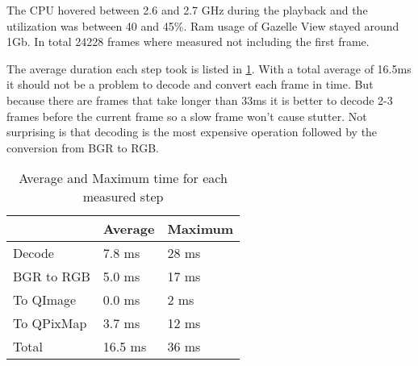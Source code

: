 The CPU hovered between 2.6 and 2.7 GHz during the playback and the utilization was between 40 and 45\%. Ram usage of Gazelle View stayed around 1Gb. In total 24228 frames where measured not including the first frame.

The average duration each step took is listed in \ref{tab:averageMaximumTime}. With a total average of 16.5ms it should not be a problem to decode and convert each frame in time. But because there are frames that take longer than 33ms it is better to decode 2-3 frames before the current frame so a slow frame won't cause stutter. Not surprising is that decoding is the most expensive operation followed by the conversion from \gls{BGR} to \gls{RGB}.

\begin{table}[!htb]
	
	\centering
	\begin{tabular}{|l|l|l|}
		\hline
							& Average	& Maximum       \\ \hline
		Decode      		& 7.8 ms	& 28 ms			\\ \hline
		\gls{BGR} to \gls{RGB}			& 5.0 ms	& 17 ms			\\ \hline
		To QImage     		& 0.0 ms	& 2 ms			\\ \hline
		To QPixMap         	& 3.7 ms	& 12 ms			\\ \hline
		Total				& 16.5 ms	& 36 ms 		\\ \hline
	\end{tabular}
	\caption{Average and Maximum time for each measured step}
	\label{tab:averageMaximumTime}
\end{table} 











